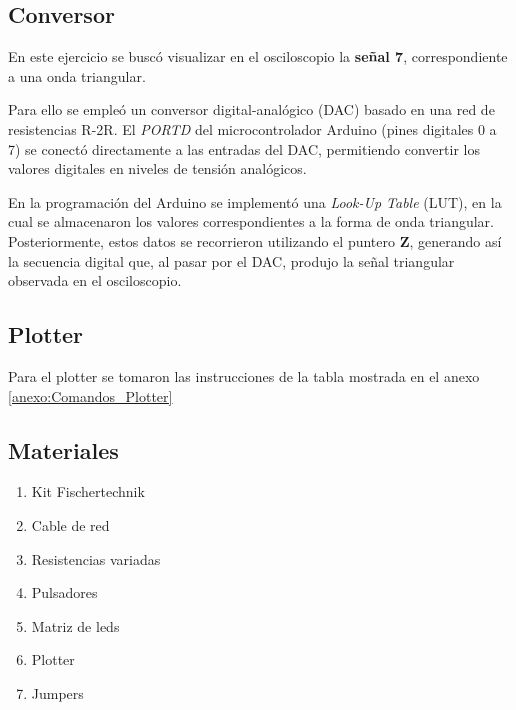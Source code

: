 \subsection{Conversor}
En este ejercicio se buscó visualizar en el osciloscopio la \textbf{señal 7}, correspondiente a una onda triangular.

Para ello se empleó un conversor digital-analógico (DAC) basado en una red de resistencias R-2R. El \textit{PORTD} del microcontrolador Arduino (pines digitales 0 a 7) se conectó directamente a las entradas del DAC, permitiendo convertir los valores digitales en niveles de tensión analógicos.

En la programación del Arduino se implementó una \textit{Look-Up Table} (LUT), en la cual se almacenaron los valores correspondientes a la forma de onda triangular. Posteriormente, estos datos se recorrieron utilizando el puntero \textbf{Z}, generando así la secuencia digital que, al pasar por el DAC, produjo la señal triangular observada en el osciloscopio.

\subsection{Plotter}

Para el plotter se tomaron las instrucciones de la tabla mostrada en el anexo \ref{anexo:Comandos_Plotter}


\subsection{Materiales}
\begin{enumerate}
    \item Kit Fischertechnik
    \item Cable de red
    \item Resistencias variadas
    \item Pulsadores
    \item Matriz de leds
    \item Plotter 
    \item Jumpers
\end{enumerate}